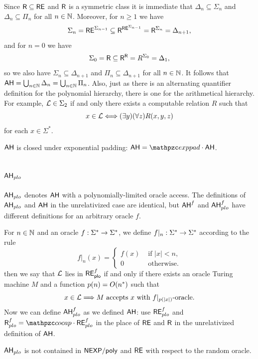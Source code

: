 Since $\mathsf{R}\subseteq\mathsf{RE}$ and $\mathsf{R}$ is a symmetric class it is
immediate that $\Delta_n\subseteq\Sigma_n$ and $\Delta_n\subseteq\Pi_n$ for all
$n\in\mathbb{N}$. Moreover, for $n\geq 1$ we have
\[
\Sigma_n=\mathsf{RE}^{\Sigma_{n-1}}\subseteq\mathsf{R}^{\mathsf{RE}^{\Sigma_{n-1}}}
=\mathsf{R}^{\Sigma_n}=\Delta_{n+1},
\]
and for $n=0$ we have
\[
\Sigma_0=\mathsf{R}\subseteq\mathsf{R}^{\mathsf{R}}=R^{\Sigma_0}=\Delta_1,
\]
so we also have $\Sigma_n\subseteq\Delta_{n+1}$ and $\Pi_n\subseteq\Delta_{n+1}$
for all $n\in\mathbb{N}$. It follows that
$\mathsf{AH}=\bigcup_{n\in\mathbb{N}}\Delta_n=\bigcup_{n\in\mathbb{N}}\Pi_n$. Also, just as there 
is an alternating quantifier definition for the polynomial hierarchy, there is 
one for the arithmetical hierarchy. For example, $\mathcal{L}\in\Sigma_2$ if and only 
there exists a computable relation $R$ such that
\[
x\in\mathcal{L}\Longleftrightarrow (\exists y)(\forall z)R(x,y,z)
\]
for each $x\in\Sigma^*$.

$\mathsf{AH}$ is closed under exponential padding: $\msf{AH}=\exppad\cdot\msf{AH}$.

\subsection{$\mathsf{AH}_{plo}$}\label{ah-plo-subsection}

$\mathsf{AH}_{plo}$ denotes $\mathsf{AH}$ with a polynomially-limited oracle
access. The definitions of $\mathsf{AH}_{plo}$ and $\mathsf{AH}$ in the
unrelativized case are identical, but $\mathsf{AH}^f$ and $\mathsf{AH}_{plo}^f$
have different definitions for an arbitrary oracle $f$.

For $n\in\mathbb{N}$ and an oracle $f:\Sigma^*\rightarrow\Sigma^*$, we define 
$f|_n:\Sigma^*\rightarrow\Sigma^*$ according to the
rule
\[
f|_n(x)=\begin{cases}f(x) &\text{ if }|x|<n, \\
0 &\text{ otherwise}.\end{cases}
\]
then we say that $\mathcal{L}$ lies in $\mathsf{RE}_{\mathsf{plo}}^f$ if and only if there exists an oracle Turing machine $M$ and a function $p(n)=O(n^*)$ such that
\[
x\in\mathcal{L}\Longrightarrow M\text{ accepts }x\text{ with
}f|_{p(|x|)}\text{-oracle}.
\]
Now we can define $\mathsf{AH}_{plo}^f$ as we defined $\mathsf{AH}$: use 
$\mathsf{RE}_{plo}^f$ and $\msf{R}_{plo}^f=\cocap\cdot\msf{RE}_{plo}^f$ in the 
place of $\mathsf{RE}$ and $\mathsf{R}$ in the unrelativized definition of $\mathsf{AH}$.

$\mathsf{AH}_{plo}$ is not contained in $\mathsf{NEXP}/\mathsf{poly}$ and $\mathsf{RE}$ with 
respect to the random oracle.

